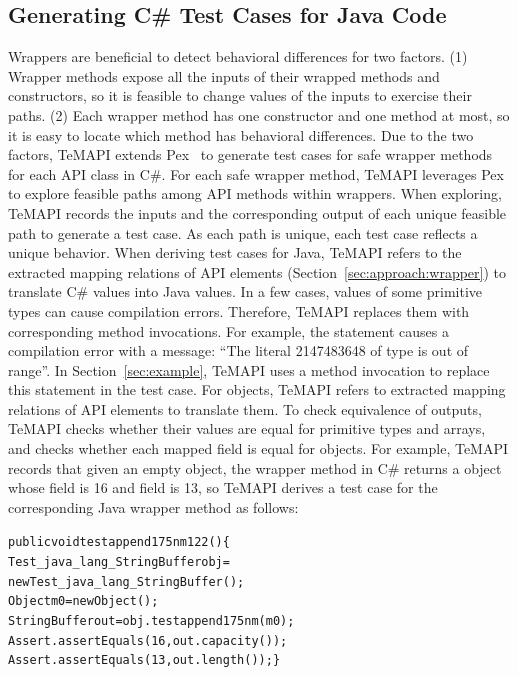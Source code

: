 \subsection{Generating C\# Test Cases for Java Code}
\label{sec:approach:single}

Wrappers are beneficial to detect behavioral differences for two factors. (1) Wrapper methods expose all the inputs of their wrapped methods and constructors, so it is feasible to change values of the inputs to exercise their paths. (2) Each wrapper method has one constructor and one method at most, so it is easy to locate which method has behavioral differences. Due to the two factors, TeMAPI extends Pex~\cite{tillmann2008pex} to generate test cases for safe wrapper methods for each API class in C\#. For each safe wrapper method, TeMAPI leverages Pex to explore feasible paths among API methods within wrappers. When exploring, TeMAPI records the inputs and the corresponding output of each unique feasible path to generate a test case. As each path is unique, each test case reflects a unique behavior. When deriving test cases for Java, TeMAPI refers to the extracted mapping relations of API elements (Section~\ref{sec:approach:wrapper}) to translate C\# values into Java values. In a few cases, values of some primitive types can cause compilation errors. Therefore, TeMAPI replaces them with corresponding method invocations. For example, the  statement causes a compilation error with a message: ``The literal 2147483648 of type  is out of range''. In Section~\ref{sec:example}, TeMAPI uses a method invocation to replace this statement in the  test case. For objects, TeMAPI refers to extracted mapping relations of API elements to translate them. To check equivalence of outputs, TeMAPI checks whether their values are equal for primitive types and arrays, and checks whether each mapped field is equal for objects. For example, TeMAPI records that given an empty object, the  wrapper method in C\# returns a  object whose  field is 16 and  field is 13, so TeMAPI derives a test case for the corresponding Java wrapper method as follows:

\begin{CodeOut}\vspace*{-1.5ex}
\begin{alltt}
public void testappend175nm122()\{
  Test_java_lang_StringBuffer obj =
      new Test_java_lang_StringBuffer();
  Object m0 = new Object();
  StringBuffer out = obj.testappend175nm(m0);
  Assert.assertEquals(16, out.capacity());	
  Assert.assertEquals(13, out.length());\}
\end{alltt}
\end{CodeOut}\vspace*{-2ex}

